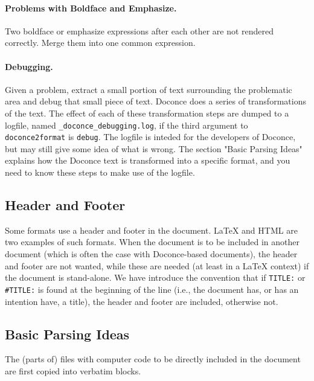 \documentclass{article}
\begin{document}
\paragraph{Problems with Boldface and Emphasize.}
Two boldface or emphasize expressions after each other are not rendered
correctly. Merge them into one common expression.

\paragraph{Debugging.}
Given a problem, extract a small portion of text surrounding the
problematic area and debug that small piece of text. Doconce does a
series of transformations of the text. The effect of each of these
transformation steps are dumped to a logfile, named
{\fontsize{10pt}{10pt}\verb!_doconce_debugging.log!}, if the third argument to {\fontsize{10pt}{10pt}\verb!doconce2format!}
is {\fontsize{10pt}{10pt}\verb!debug!}. The logfile is inteded for the developers of Doconce, but
may still give some idea of what is wrong.  The section "Basic Parsing
Ideas" explains how the Doconce text is transformed into a specific
format, and you need to know these steps to make use of the logfile.

\subsection{Header and Footer}

Some formats use a header and footer in the document. {\LaTeX} and
HTML are two examples of such formats. When the document is to be
included in another document (which is often the case with
Doconce-based documents), the header and footer are not wanted, while
these are needed (at least in a {\LaTeX} context) if the document is
stand-alone. We have introduce the convention that if {\fontsize{10pt}{10pt}\verb!TITLE:!} or
{\fontsize{10pt}{10pt}\verb!#TITLE:!} is found at the beginning of the line (i.e., the document
has, or has an intention have, a title), the header and footer
are included, otherwise not.

\subsection{Basic Parsing Ideas}


The (parts of) files with computer code to be directly included in
the document are first copied into verbatim blocks.
\end{document}
